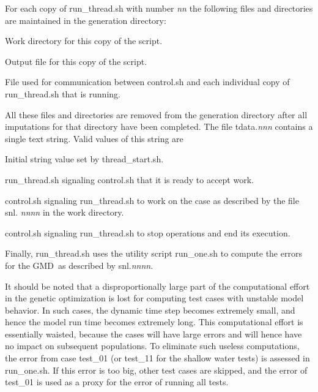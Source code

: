 \documentclass[12pt]{article}
\newcommand{\gmd}{GMD}
\newcommand{\file}{\sf}
\newcommand{\code}{\tt}
\newenvironment{flist}{\begin{list}{nofile ?}{\parsep 0mm
            \itemsep 0mm \leftmargin 35mm \labelwidth 25mm
            \rightmargin 10mm}}{\end{list}}
\newcommand{\fit}[2]{\item[{\file{#1}}\hfill]{#2}}
\newenvironment{plist}{\begin{list}{nofile ?}{\parsep 0mm
            \itemsep 0mm \leftmargin 35mm \labelwidth 25mm
            \rightmargin 10mm}}{\end{list}}
\newcommand{\pit}[2]{\item[{\code{#1}}\hfill]{#2}}
\begin{document}
\noindent
For each copy of {\file run\_thread.sh} with number {\it nn} the following
files and directories are maintained in the generation directory:

\begin{flist}
\fit{thread\_{\it nnn}}{Work directory for this copy of the script.}
\fit{thread\_{\it nnn}.out}{Output file for this copy of the script.}
\fit{tdata.{\it nnn}.out}{File used for communication between {\file
                         control.sh} and each individual copy of {\file
                         run\_thread.sh} that is running.}
\end{flist}

\noindent
All these files and directories are removed from the generation directory
after all imputations for that directory have been completed.  The file {\file
tdata.{\it nnn}} contains a single text string. Valid values of this string
are

\begin{plist}
\pit{starting}      {Initial string value set by {\file thread\_start.sh}.}
\pit{ready to go} {{\file run\_thread.sh} signaling {\file control.sh} that it
                     is ready to accept work.}
\pit{snl.{\it nnnn}}{{\file control.sh} signaling {\file run\_thread.sh} to
                      work on the case as described by the file {\file snl.{\it
                      nnnn}} in the work directory.}
\pit{done}           {{\file control.sh} signaling {\file run\_thread.sh} to
                     stop operations and end its execution.}
\end{plist}

\noindent
Finally, {\file run\_thread.sh} uses the utility script {\file run\_one.sh} to
compute the errors for the \gmd\ as described by {\file snl.{\it nnnn}}. 

\vspace{\baselineskip}
\noindent
It should be noted that a disproportionally large part of the computational
effort in the genetic optimization is lost for computing test cases with
unstable model behavior. In such cases, the dynamic time step becomes
extremely small, and hence the model run time becomes extremely long. This
computational effort is essentially waisted, because the cases will have large
errors and will hence have no impact on subsequent populations. To eliminate
such useless computations, the error from case {\file test\_01} (or {\file
test\_11} for the shallow water tests) is assessed in {\file run\_one.sh}. If
this error is too big, other test cases are skipped, and the error of {\file
test\_01} is used as a proxy for the error of running all tests.
\end{document}
